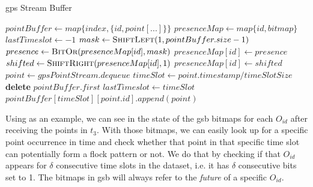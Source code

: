 \begin{algorithm}[h!]
\caption{\ac{gps} Stream Buffer}
\label{alg:gpsb}
\begin{algorithmic}[1]
    \State $pointBuffer \gets map\{index, \{id, point[...]\}\}$
    \State $presenceMap \gets map\{id, bitmap\}$
    \State $lastTimeslot \gets -1$
    \State
        \State $mask \gets \Call{ShiftLeft}{1, pointBuffer.size - 1}$
        \State $presence \gets \Call{BitOr}{presenceMap[id], mask}$
        \State $presenceMap[id] \gets presence$
    \EndProcedure
    \State
            \State $shifted \gets \Call{ShiftRight}{presenceMap[id], 1}$
            \State $presenceMap[id] \gets shifted$
        \EndFor
    \EndProcedure
    \State
        \Loop
            \State $point \gets gpsPointStream.dequeue$
            \State $timeSlot \gets point.timestamp / timeSlotSize$
                    \State {}
                    \State \textbf{delete} $pointBuffer.first$
                    \State {}
                \EndIf
                \State $lastTimeslot \gets timeSlot$
            \EndIf
            \State $pointBuffer[timeSlot][point.id].append(point)$
            \State {}
        \EndLoop
    \EndProcedure
\end{algorithmic}
\end{algorithm}

Using  as an example, we can see in  the state of the \ac{gsb} bitmaps for each
$O_{id}$ after receiving the points in $t_3$. With those bitmaps, we can easily look up for a specific point occurrence
in time and check whether that point in that specific time slot can potentially form a flock pattern or not. We do that
by checking if that $O_{id}$ appears for $\delta$ consecutive time slots in the dataset, i.e. it has $\delta$
consecutive bits set to 1. The bitmaps in \ac{gsb} will always refer to the \textit{future} of a specific $O_{id}$.

